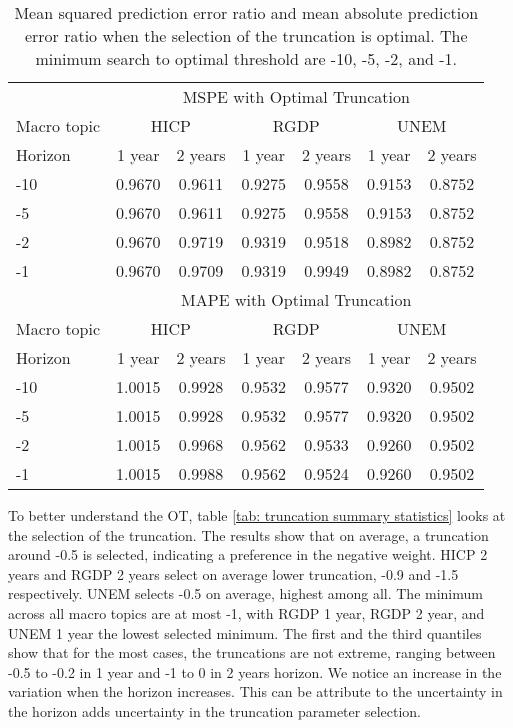 \documentclass[11pt]{article}
\begin{document}
\begin{table}[!h]
	\centering
	\caption{Mean squared prediction error ratio and mean absolute prediction error ratio when the selection of the truncation is optimal. The minimum search to optimal threshold are -10, -5, -2, and -1.}
	\label{tab: oos mspe}
	\begin{tabular}{lcccccc}
		\hline
		&\multicolumn{6}{c}{MSPE with Optimal Truncation}\\
		\cmidrule(lr){2-7}
		Macro topic & \multicolumn{2}{c}{HICP} & \multicolumn{2}{c}{RGDP} & \multicolumn{2}{c}{UNEM} \\
		\cmidrule(lr){2-3} \cmidrule(lr){4-5}\cmidrule(lr){6-7}
		Horizon     & 1 year & 2 years & 1 year & 2 years & 1 year & 2 years \\ 
		\hline
		-10 & 0.9670   & 0.9611   & 0.9275   & 0.9558   & 0.9153   & 0.8752   \\ 
		-5  & 0.9670   & 0.9611   & 0.9275   & 0.9558   & 0.9153   & 0.8752   \\ 
		-2  & 0.9670   & 0.9719   & 0.9319   & 0.9518   & 0.8982   & 0.8752   \\ 
		-1  & 0.9670   & 0.9709   & 0.9319   & 0.9949   & 0.8982   & 0.8752   \\ 
		\hline
		&\multicolumn{6}{c}{MAPE with Optimal Truncation}\\
		\cmidrule(lr){2-7}
		Macro topic & \multicolumn{2}{c}{HICP} & \multicolumn{2}{c}{RGDP} & \multicolumn{2}{c}{UNEM} \\
		\cmidrule(lr){2-3} \cmidrule(lr){4-5}\cmidrule(lr){6-7}
		Horizon     & 1 year & 2 years & 1 year & 2 years & 1 year & 2 years \\ 
		\hline
		-10 & 1.0015   & 0.9928   & 0.9532   & 0.9577   & 0.9320   & 0.9502   \\
		-5  & 1.0015   & 0.9928   & 0.9532   & 0.9577   & 0.9320   & 0.9502   \\
		-2  & 1.0015   & 0.9968   & 0.9562   & 0.9533   & 0.9260   & 0.9502   \\
		-1  & 1.0015   & 0.9988   & 0.9562   & 0.9524   & 0.9260   & 0.9502   \\
		\hline
	\end{tabular}
\end{table}

To better understand the OT, table
\ref{tab: truncation summary statistics} looks at the selection of the
truncation. The results show that on average, a truncation around -0.5
is selected, indicating a preference in the negative weight. HICP
2 years and RGDP 2 years select on average lower truncation, -0.9 and
-1.5 respectively. UNEM selects -0.5 on average, highest among all. The
minimum across all macro topics are at most -1, with RGDP 1 year, RGDP 2
year, and UNEM 1 year the lowest selected minimum. The first and the
third quantiles show that for the most cases, the truncations are not
extreme, ranging between -0.5 to -0.2 in 1 year and -1 to 0 in 2 years
horizon. We notice an increase in the variation when the horizon
increases. This can be attribute to the uncertainty in the horizon adds
uncertainty in the truncation parameter selection.
\end{document}
